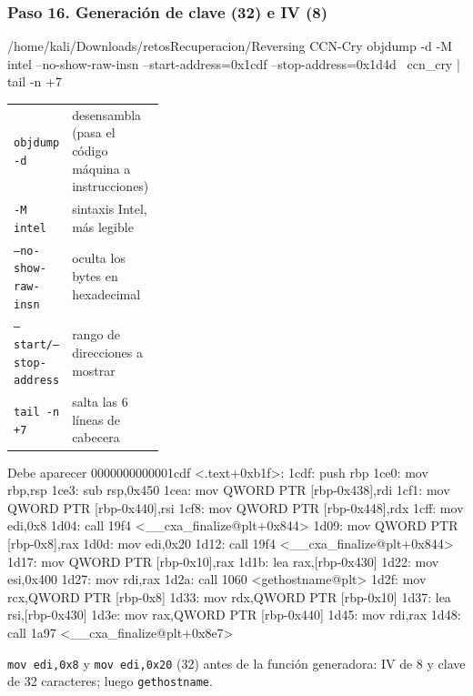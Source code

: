 \documentclass[11pt,a4paper]{article}
\begin{document}
\subsubsection*{Paso 16. Generación de clave (32) e IV (8)}
\begin{comando}{/home/kali/Downloads/retosRecuperacion/Reversing CCN-Cry}
objdump -d -M intel --no-show-raw-insn --start-address=0x1cdf --stop-address=0x1d4d \
  ccn_cry | tail -n +7
\end{comando}
\begin{tcolorbox}[enhanced, breakable, colback=gray!3, colframe=gray!35, boxrule=0.3pt, arc=1pt, left=4pt, right=4pt, top=2pt, bottom=2pt, fonttitle=\sffamily\scriptsize\bfseries, coltitle=black!70, colbacktitle=gray!10, title={Qué hace cada parte}, attach title to upper, before skip=2pt, after skip=4pt, fontupper=\small]
\par{\renewcommand{\arraystretch}{1.12}\begin{tabularx}{\linewidth}{@{}>{\raggedright\arraybackslash}p{0.33\linewidth}>{\raggedright\arraybackslash}X@{}}
\texttt{objdump -d} & desensambla (pasa el código máquina a instrucciones) \\
\texttt{-M intel} & sintaxis Intel, más legible \\
\texttt{--no-show-raw-insn} & oculta los bytes en hexadecimal \\
\texttt{--start/\allowbreak{}--stop-address} & rango de direcciones a mostrar \\
\texttt{tail -n +7} & salta las 6 líneas de cabecera \\
\end{tabularx}}
\end{tcolorbox}
\begin{salida}{Debe aparecer}
0000000000001cdf <.text+0xb1f>:
    1cdf:       push   rbp
    1ce0:       mov    rbp,rsp
    1ce3:       sub    rsp,0x450
    1cea:       mov    QWORD PTR [rbp-0x438],rdi
    1cf1:       mov    QWORD PTR [rbp-0x440],rsi
    1cf8:       mov    QWORD PTR [rbp-0x448],rdx
    1cff:       mov    edi,0x8
    1d04:       call   19f4 <__cxa_finalize@plt+0x844>
    1d09:       mov    QWORD PTR [rbp-0x8],rax
    1d0d:       mov    edi,0x20
    1d12:       call   19f4 <__cxa_finalize@plt+0x844>
    1d17:       mov    QWORD PTR [rbp-0x10],rax
    1d1b:       lea    rax,[rbp-0x430]
    1d22:       mov    esi,0x400
    1d27:       mov    rdi,rax
    1d2a:       call   1060 <gethostname@plt>
    1d2f:       mov    rcx,QWORD PTR [rbp-0x8]
    1d33:       mov    rdx,QWORD PTR [rbp-0x10]
    1d37:       lea    rsi,[rbp-0x430]
    1d3e:       mov    rax,QWORD PTR [rbp-0x440]
    1d45:       mov    rdi,rax
    1d48:       call   1a97 <__cxa_finalize@plt+0x8e7>
\end{salida}
\begin{nota}\texttt{mov edi,0x8} y \texttt{mov edi,0x20} (32) antes de la función generadora: IV de 8 y clave de 32 caracteres; luego \texttt{gethostname}.\end{nota}
\end{document}
